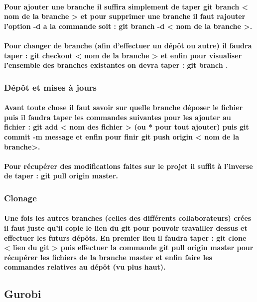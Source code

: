 \documentclass[a4paper, 12pt, twoside]{article}
\begin{document}
\paragraph{Pour ajouter une branche il suffira simplement de taper  git branch < nom de la branche >  et pour supprimer une branche il faut rajouter
l'option -d a la commande soit :  git branch -d < nom de la branche >.}
\paragraph{  Pour changer de branche (afin d'effectuer un dépôt ou autre) il faudra taper :  git checkout < nom de la branche >   et enfin pour visualiser
l'ensemble des branches existantes on devra taper :  git branch .}
\subsubsection{Dépôt et mises à jours}
\paragraph{ Avant toute chose il faut savoir sur quelle branche déposer le fichier puis il faudra taper les commandes suivantes pour les ajouter 
au fichier :  git add < nom des fichier >  (ou * pour tout ajouter) puis  git commit -m message  et enfin pour finir git push origin < nom de la branche>.}
\paragraph{Pour récupérer des modifications faites sur le projet il suffit à l'inverse de taper : 
 git pull origin master.}
\subsubsection{Clonage}
\paragraph{Une fois les autres branches (celles des différents collaborateurs) crées il faut juste qu'il copie le lien du git pour pouvoir 
travailler dessus et effectuer les futurs dépôts. En premier lieu il faudra taper :  git clone < lien du git >  puis effectuer la commande
 git pull origin master  pour récupérer les fichiers de la branche master et enfin faire les commandes relatives au dépôt (vu plus haut).}

\subsection{Gurobi}
\newpage
\end{document}
